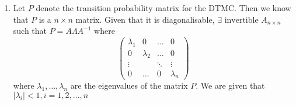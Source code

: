 \documentclass[12pt, oneside]{article}
\begin{document}
\begin{enumerate}
{\begin{enumerate}
{            Note that we have an overconstrained system of linear equations, given by
            \(\pi P = \pi, \sum_{i=0}^{n-1} \pi_i = 1\) along with the condition that
            \(\pi_i \geq 0 \,\forall\, i = 0, 1, \ldots, n - 1\)

            Thus, the condition that \(det(P - I) = 0\) is necessary for stationary distribution
            to exist but not sufficient.
            
            For the given transition matrix:
            \begin{align*}
                \det(P - I) &= \begin{vmatrix}
                    -0.4 & 0.2 & 0.1 & 0 & 0 & 0.1 & 0 & 0 \\
                    0.1	& -0.9 & 0.2 & 0.2 & 0 & 0 & 0.4 & 0 \\
                    0.2 & 0.3 & -1 & 0 & 0 & 0.1 & 0.2 & 0.2 \\
                    0.5 & 0.2 & 0.1 & -0.9 & 0 & 0.1 & 0 & 0 \\
                    0.1 & 0.1 & 0.1 & 0.1 & -0.9 & 0.1 & 0.1 & 0.3 \\
                    0.3 & 0 & 0.3 & 0.2 & 0.1 & -1 & 0 & 0.1 \\
                    0 & 0 & 0 & 0 & 0.5 & 0.4 & -1 & 0.1 \\
                    0 & 0.1 & 0.1 & 0.1 & 0 & 0.2 & 0.2 & -0.7
                \end{vmatrix} \\
                        &\neq 0
            \end{align*}

            This tells us that the given DTMC will not have a stationary distribution.
        }
        \item {
            Let \(P\) denote the transition probability matrix for the DTMC. Then we know
            that \(P\) is a \(n \times n\) matrix. Given that it is diagonalisable,
            \(\exists \text{ invertible } A_{n \times n}\) such that \(P = A \Lambda A^{-1}\)
            where
            \[\begin{pmatrix}
                \lambda_1 & 0         & \dots  & 0 \\
                0         & \lambda_2 & \dots  & 0 \\
                \vdots    &           & \ddots & \vdots\\
                0         & \dots     & 0      & \lambda_n 
            \end{pmatrix}\]
            where \(\lambda_1, \ldots, \lambda_n\) are the eigenvalues of the matrix \(P\).
            We are given that \(|\lambda_i| < 1, i = 1, 2, \ldots, n  \)
            
}
\end{enumerate}}
\end{enumerate}
\end{document}
